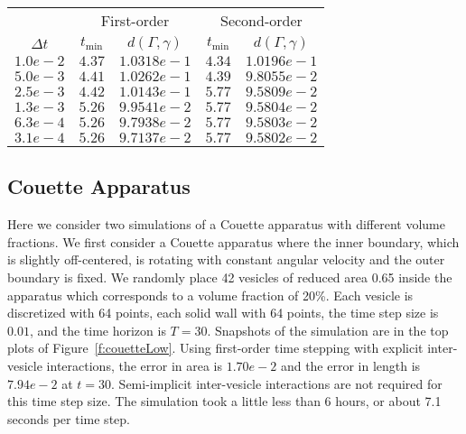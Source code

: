 \begin{table}[htp] 
  \begin{centering} 
  \begin{tabular}{c|cc|cc} 
  & \multicolumn{2}{c|}{First-order} &
    \multicolumn{2}{c}{Second-order} \\
    $\Delta t$ & $t_{\min}$ & $d(\Gamma,\gamma)$ &  
      $t_{\min}$ & $d(\Gamma,\gamma)$  \\ \hline
    $1.0e-2$ & $4.37$ & $1.0318e-1$ & $4.34$ & $1.0196e-1$ \\
    $5.0e-3$ & $4.41$ & $1.0262e-1$ & $4.39$ & $9.8055e-2$ \\
    $2.5e-3$ & $4.42$ & $1.0143e-1$ & $5.77$ & $9.5809e-2$ \\
    $1.3e-3$ & $5.26$ & $9.9541e-2$ & $5.77$ & $9.5804e-2$ \\
    $6.3e-4$ & $5.26$ & $9.7938e-2$ & $5.77$ & $9.5803e-2$ \\ 
    $3.1e-4$ & $5.26$ & $9.7137e-2$ & $5.77$ & $9.5802e-2$ 
  \end{tabular}
 \end{centering}
\end{table}



\subsection{Couette Apparatus}
\label{s:couette}
Here we consider two simulations of a Couette apparatus with different
volume fractions.  We first consider a Couette apparatus where the
inner boundary, which is slightly off-centered, is rotating with
constant angular velocity and the outer boundary is fixed.  We randomly
place 42 vesicles of reduced area 0.65 inside the apparatus which
corresponds to a volume fraction of 20\%.  Each vesicle is discretized
with 64 points, each solid wall with 64 points, the time step size is
$0.01$, and the time horizon is $T=30$.  Snapshots of the simulation
are in the top plots of Figure~\ref{f:couetteLow}.  Using first-order
time stepping with explicit inter-vesicle interactions, the error in
area is $1.70e-2$ and the error in length is $7.94e-2$ at $t=30$.
Semi-implicit inter-vesicle interactions are not required for this time
step size.  The simulation took a little less than 6 hours, or about
7.1 seconds per time step.

